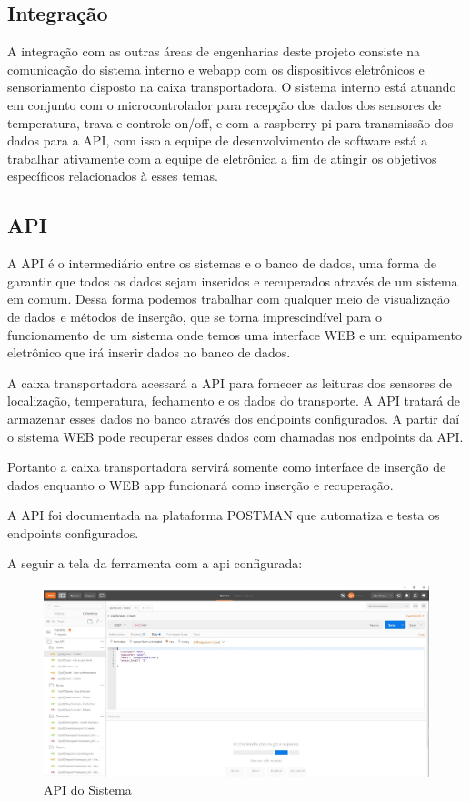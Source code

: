 			\subsection{Integração}
			A integração com as outras áreas de engenharias deste projeto consiste na comunicação do sistema interno e webapp com os dispositivos eletrônicos e sensoriamento disposto na caixa transportadora. O sistema interno está atuando em conjunto com o microcontrolador para recepção dos dados dos sensores de temperatura, trava e controle on/off, e com a raspberry pi para transmissão dos dados para a API, com isso a equipe de desenvolvimento de software está a trabalhar ativamente com a equipe de eletrônica a fim de atingir os objetivos específicos relacionados à esses temas.
			
			\subsection{API}
			
			A API é o intermediário entre os sistemas e o banco de dados, uma forma de garantir que todos os dados sejam inseridos e recuperados através de um sistema em comum. Dessa forma podemos trabalhar com qualquer meio de visualização de dados e métodos de inserção, que se torna imprescindível para o funcionamento de um sistema onde temos uma interface WEB e um equipamento eletrônico que irá inserir dados no banco de dados.
			
			A caixa transportadora acessará a API para fornecer as leituras dos sensores de localização, temperatura, fechamento e os dados do transporte. A API tratará de armazenar esses dados no banco através dos endpoints configurados. A partir daí o sistema WEB pode recuperar esses dados com chamadas nos endpoints da API. 
			
			Portanto a caixa transportadora servirá somente como interface de inserção de dados enquanto o WEB app funcionará como inserção e recuperação.
			
			A API foi documentada na plataforma POSTMAN que automatiza e testa os endpoints configurados. 
			
			A seguir a tela da ferramenta com a api configurada:
			
			\begin{figure}[H]
				\centering
				\includegraphics[width=16cm]{figuras/api_software.JPG}
				\caption{API do Sistema}
			\end{figure}
			
